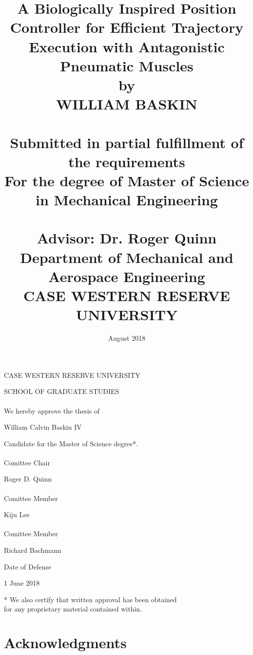 \documentclass[12pt, letterpaper, oneside, onecolumn]{report} %
\title{
  {A Biologically Inspired Position Controller for Efficient Trajectory Execution with Antagonistic Pneumatic Muscles}\\
  {\large by \\
  WILLIAM BASKIN \\~\\
  Submitted in partial fulfillment of the requirements\\
  For the degree of Master of Science in Mechanical Engineering\\~\\
  Advisor: Dr. Roger Quinn\\
  Department of Mechanical and Aerospace Engineering\\
  CASE WESTERN RESERVE UNIVERSITY}\\
}
\date{August 2018}
\begin{document}
\maketitle

\clearpage
\thispagestyle{empty}

\begin{center}
CASE WESTERN RESERVE UNIVERSITY

SCHOOL OF GRADUATE STUDIES \\~\\

\hspace{-\parindent}We hereby approve the thesis of

William Calvin Baskin IV

\hspace{-\parindent}Candidate for the Master of Science degree*.\\~\\

Comittee Chair

Roger D. Quinn\\~\\


Comittee Member

Kiju Lee\\~\\

Comittee Member

Richard Bachmann

\vfill

Date of Defense

1 June 2018

* We also certify that written approval has been obtained\\for any proprietary material contained within.
\end{center}

\clearpage
\setcounter{page}{1}

\tableofcontents

\listoffigures

\chapter*{Acknowledgments}
\label{chap:acknowledgements}
\end{document}
